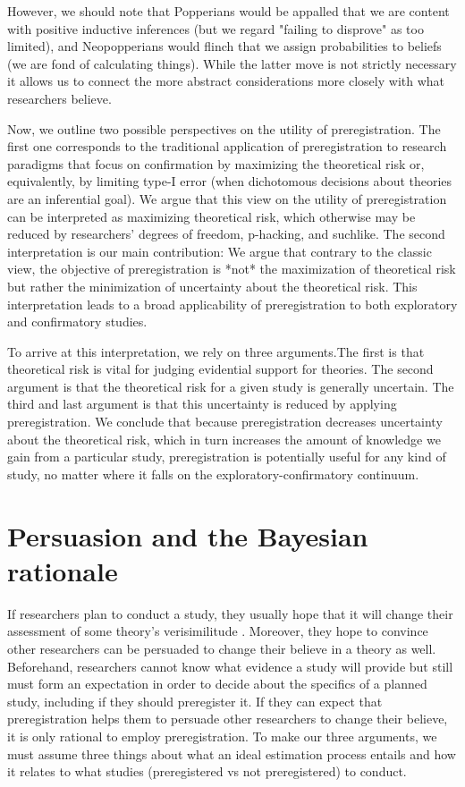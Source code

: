 \documentclass[jou,a4paper]{apa7}
\begin{document}
However, we should note that Popperians would be appalled that we are content with positive inductive inferences (but we regard "failing to disprove" as too limited), and Neopopperians would flinch that we assign probabilities to beliefs (we are fond of calculating things).
While the latter move is not strictly necessary it allows us to connect the more abstract considerations more closely with what researchers believe.\par
Now, we outline two possible perspectives on the utility of preregistration. The first one corresponds to the traditional application of preregistration to research paradigms that focus on confirmation by maximizing the theoretical risk or, equivalently, by limiting type-I error (when dichotomous decisions about theories are an inferential goal). We argue that this view on the utility of preregistration can be interpreted as maximizing theoretical risk, which otherwise may be reduced by researchers' degrees of freedom, p-hacking, and suchlike.
The second interpretation is our main contribution:
We argue that contrary to the classic view, the objective of preregistration is *not* the maximization of theoretical risk but rather the minimization of uncertainty about the theoretical risk. This interpretation leads to a broad applicability of preregistration to both exploratory and confirmatory studies.\par
To arrive at this interpretation, we rely on three arguments.The first is that theoretical risk is vital for judging evidential support for theories.
The second argument is that the theoretical risk for a given study is generally uncertain. The third and last argument is that this uncertainty is reduced by applying preregistration. We conclude that because preregistration decreases uncertainty about the theoretical risk, which in turn increases the amount of knowledge we gain from a particular study, preregistration is potentially useful for any kind of study, no matter where it falls on the exploratory-confirmatory continuum.

\section{Persuasion and the Bayesian rationale}
If researchers plan to conduct a study, they usually hope that it will change their assessment of some theory's verisimilitude \parencite{niiniluotoVerisimilitudeThirdPeriod1998}.
Moreover, they hope to convince other researchers can be persuaded to change their believe in a theory as well.
Beforehand, researchers cannot know what evidence a study will provide but still must form an expectation in order to decide about the specifics of a planned study, including if they should preregister it. If they can expect that preregistration helps them to persuade other researchers to change their believe, it is only rational to employ preregistration. To make our three arguments, we must assume three things about what an ideal estimation process  entails and how it relates to what studies (preregistered vs not preregistered) to conduct.
\end{document}

